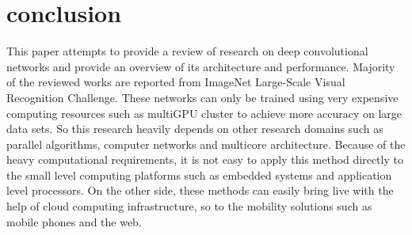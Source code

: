 \documentclass{article}
\begin{document}
\section{conclusion}
This paper attempts to provide a  review of research on deep convolutional networks  and provide an overview of  its architecture and performance. Majority of the reviewed  works are reported from ImageNet Large-Scale Visual Recognition Challenge. These networks can only be trained using very expensive computing resources such as multiGPU cluster  to achieve more accuracy on large data sets. So  this research heavily depends on other research domains such as parallel algorithms, computer networks and multicore architecture. Because of the heavy computational requirements, it is not easy to apply this method directly  to the small level computing platforms such as embedded systems and application level  processors. On the other side, these methods can easily bring  live with the help of  cloud computing infrastructure, so to the mobility solutions such as mobile phones and the web.



\end{document}
